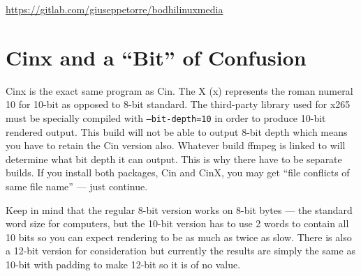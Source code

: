 \url{https://gitlab.com/giuseppetorre/bodhilinuxmedia}	

\section{Cinx and a “Bit” of Confusion}%
\label{sec:cinx_and_a_bit_of_confusion}

Cinx is the exact same program as Cin.  
The X (x) represents the roman numeral 10 for 10-bit as opposed to 8-bit standard.  
The third-party library used for x265 must be specially compiled with \texttt{--bit-depth=10} in order to produce 10-bit rendered output.  
This build will not be able to output 8-bit depth which means you have to retain the Cin version also.  
Whatever build ffmpeg is linked to will determine what bit depth it can output.  
This is why there have to be separate builds.  
If you install both packages, Cin and CinX, you may get “file conflicts of same file name” --- just continue.

Keep in mind that the regular 8-bit version works on 8-bit bytes --- the standard word size for computers, but the 10-bit version has to use 2 words to contain all 10 bits so you can expect rendering to be as much as twice as slow.  
There is also a 12-bit version for consideration but currently the results are simply the same as 10-bit with padding to make 12-bit so it is of no value.

















